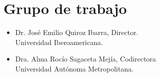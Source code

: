 \section {Grupo de trabajo}
\begin{itemize}
	\item Dr. José Emilio Quiroz Ibarra, Director.\\
	Universidad Iberoamericana.
	\item Dra. Alma Rocío Sagaceta Mejía, Codirectora\\
	Universidad Autónoma Metropolitana.
\end{itemize}